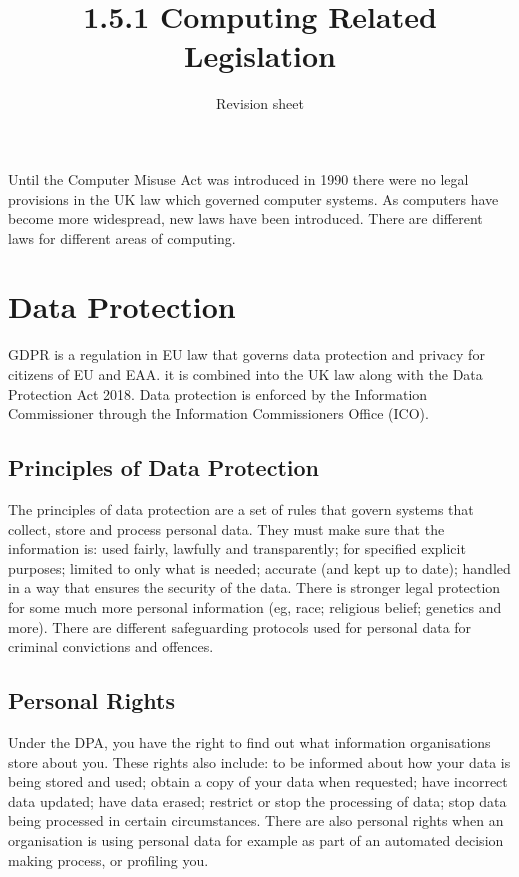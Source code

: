 \documentclass[a4paper,11pt, twocolumn]{article}
\title{1.5.1 Computing Related Legislation}
\author{Revision sheet}
\date{}
\begin{document}
\maketitle
\thispagestyle{fancy}

\noindent Until the Computer Misuse Act was introduced in 1990 there were no legal provisions in the UK law which governed computer systems. As computers have become more widespread, new laws have been introduced. There are different laws for different areas of computing.

\section{Data Protection}
GDPR is a regulation in EU law that governs data protection and privacy for citizens of EU and EAA. it is combined into the UK law along with the Data Protection Act 2018.
Data protection is enforced by the Information Commissioner through the Information Commissioners Office (ICO).
\subsection{Principles of Data Protection}
The principles of data protection are a set of rules that govern systems that collect, store and process personal data. They must make sure that the information is: used fairly, lawfully and transparently; for specified explicit purposes; limited to only what is needed; accurate (and kept up to date); handled in a way that ensures the security of the data.
There is stronger legal protection for some much more personal information (eg, race; religious belief; genetics and more). There are different safeguarding protocols used for personal data for criminal convictions and offences.
\subsection{Personal Rights}
Under the DPA, you have the right to find out what information organisations store about you. These rights also include: to be informed about how your data is being stored and used; obtain a copy of your data when requested; have incorrect data updated; have data erased; restrict or stop the processing of data; stop data being processed in certain circumstances. There are also personal rights when an organisation is using personal data for example as part of an automated decision making process, or profiling you. 
\end{document}
